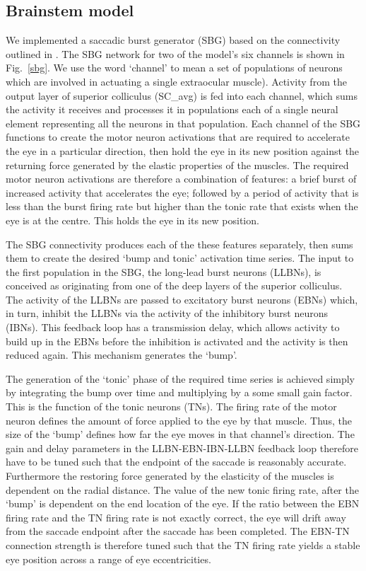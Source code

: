 \documentclass{frontiersSCNS}
\begin{document}
\subsection{Brainstem model}

We implemented a saccadic burst generator (SBG) based on the
connectivity outlined in \cite{gancarz_neural_1998}. The SBG network
for two of the model's six channels is shown in Fig.~\ref{sbg}. We use
the word `channel' to mean a set of populations of neurons which are
involved in actuating a single extraocular muscle). Activity from the
output layer of superior colliculus
%
(SC\_avg) is fed into each channel, which sums the activity it
receives and processes it in populations each of a single neural
element representing all the neurons in that population. Each channel
of the SBG functions to create the motor neuron activations that are
required to accelerate the eye in a particular direction, then hold
the eye in its new position against the returning force generated by
the elastic properties of the muscles.  The required motor neuron
activations are therefore a combination of features: a brief burst of
increased activity that accelerates the eye; followed by a period of
activity that is less than the burst firing rate but higher than the
tonic rate that exists when the eye is at the centre. This holds the
eye in its new position.

The SBG connectivity produces each of the these features separately,
then sums them to create the desired `bump and tonic' activation time
series.  The input to the first population in the SBG, the long-lead
burst neurons (LLBNs), is conceived as originating from one of the
deep layers of the superior colliculus.  The activity of the LLBNs are
passed to excitatory burst neurons (EBNs) which, in turn, inhibit the
LLBNs via the activity of the inhibitory burst neurons (IBNs).  This
feedback loop has a transmission delay, which allows activity to build
up in the EBNs before the inhibition is activated and the activity is
then reduced again.  This mechanism generates the `bump'.

The generation of the `tonic' phase of the required time series is
achieved simply by integrating the bump over time and multiplying by a
some small gain factor.  This is the function of the tonic neurons
(TNs).  The firing rate of the motor neuron defines the amount of
force applied to the eye by that muscle.  Thus, the size of the `bump'
defines how far the eye moves in that channel's direction.  The gain
and delay parameters in the LLBN-EBN-IBN-LLBN feedback loop therefore
have to be tuned such that the endpoint of the saccade is reasonably
accurate.  Furthermore the restoring force generated by the elasticity
of the muscles is dependent on the radial distance.  The value of the
new tonic firing rate, after the `bump' is dependent on the end
location of the eye.  If the ratio between the EBN firing rate and the
TN firing rate is not exactly correct, the eye will drift away from
the saccade endpoint after the saccade has been completed.  The EBN-TN
connection strength is therefore tuned such that the TN firing rate
yields a stable eye position across a range of eye eccentricities.
\end{document}
